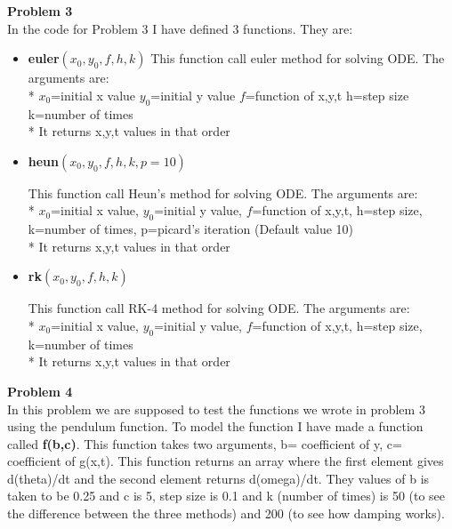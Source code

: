 \documentclass{article}
\begin{document}
\clearpage
\textbf{Problem 3}\vspace{1.5em}
\\
In the code for Problem 3 I have defined 3 functions. They are:
\begin{itemize}
\item{\textbf{euler$(x_0,y_0,f,h,k)$}}
This function call euler method for solving ODE. The arguments are:
\\*
       $ x_0$=initial x value
        $y_0$=initial y value
        $f$=function of x,y,t
        h=step size
        k=number of times
       \\*
        It returns x,y,t values in that order


\item{\textbf{heun$(x_0,y_0,f,h,k,p=10)$}}\vspace{0.2em}

This function call Heun's method for solving ODE. The arguments are:
\\*
        $x_0$=initial x value, 
        $y_0$=initial y value, 
        $f$=function of x,y,t, 
        h=step size, 
        k=number of times, 
        p=picard's iteration (Default value 10)
        \\*
        It returns x,y,t values in that order


\item{\textbf{rk$(x_0,y_0,f,h,k)$}}\vspace{0.2em}

This function call RK-4 method for solving ODE. The arguments are:
\\*
      $ x_0$=initial x value, 
        $y_0$=initial y value, 
        $f$=function of x,y,t, 
        h=step size, 
        k=number of times
        \\*
        It returns x,y,t values in that order


\vspace{0.2em}

\end{itemize}

\vspace{1.5em}
\textbf{Problem 4}\vspace{1.5em}
\\
In this problem we are supposed to test the functions we wrote in problem 3 using the pendulum function. To model the function I have made a function called \textbf{f(b,c)}. This function takes two arguments, b= coefficient of y, c= coefficient of g(x,t). This function returns an array where the first element gives d(theta)/dt and the second element returns d(omega)/dt. They values of b is taken to be 0.25 and c is 5, step size is 0.1 and k (number of times) is 50 (to see the difference between the three methods) and 200 (to see how damping works).
\\
\end{document}
